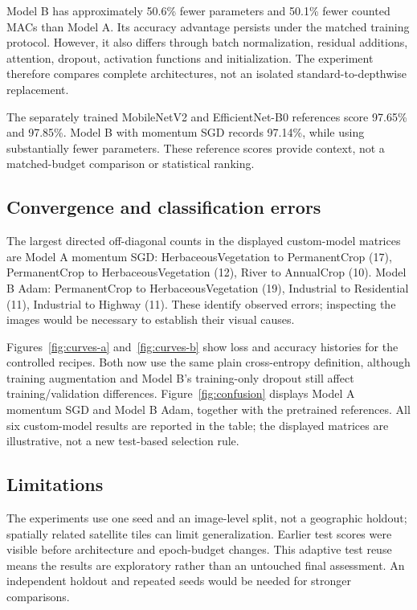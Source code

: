 \documentclass[11pt,a4paper]{article}
\begin{document}
Model B has approximately 50.6\% fewer parameters and 50.1\% fewer counted MACs than Model A. Its accuracy advantage persists under the matched training protocol. However, it also differs through batch normalization, residual additions, attention, dropout, activation functions and initialization. The experiment therefore compares complete architectures, not an isolated standard-to-depthwise replacement.

The separately trained MobileNetV2 and EfficientNet-B0 references score 97.65\% and 97.85\%. Model B with momentum SGD records 97.14\%, while using substantially fewer parameters. These reference scores provide context, not a matched-budget comparison or statistical ranking.

\subsection{Convergence and classification errors}
The largest directed off-diagonal counts in the displayed custom-model matrices are Model A momentum SGD: HerbaceousVegetation to PermanentCrop (17), PermanentCrop to HerbaceousVegetation (12), River to AnnualCrop (10). Model B Adam: PermanentCrop to HerbaceousVegetation (19), Industrial to Residential (11), Industrial to Highway (11). These identify observed errors; inspecting the images would be necessary to establish their visual causes.

Figures~\ref{fig:curves-a} and~\ref{fig:curves-b} show loss and accuracy histories for the controlled recipes. Both now use the same plain cross-entropy definition, although training augmentation and Model B's training-only dropout still affect training/validation differences. Figure~\ref{fig:confusion} displays Model A momentum SGD and Model B Adam, together with the pretrained references. All six custom-model results are reported in the table; the displayed matrices are illustrative, not a new test-based selection rule.

\subsection{Limitations}
The experiments use one seed and an image-level split, not a geographic holdout; spatially related satellite tiles can limit generalization. Earlier test scores were visible before architecture and epoch-budget changes. This adaptive test reuse means the results are exploratory rather than an untouched final assessment. An independent holdout and repeated seeds would be needed for stronger comparisons.
\end{document}
